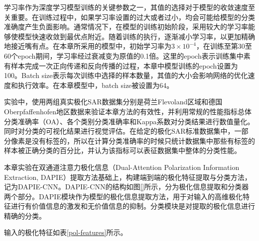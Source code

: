 学习率作为深度学习模型训练的关键参数之一，其值的选择对于模型的收敛速度至关重要。在训练过程中，如果学习率设置的过大或者过小，均会可能给模型的分类准确度产生负面影响。通常情况下，在模型的训练初始阶段，采用较大的学习率能够使模型快速收敛到最优点附近。随着训练的执行，逐渐减小学习率，以更加精确地接近嘴有点。在本章所采用的模型中，初始学习率为$3\times 10^{-4}$，在训练至第30至60个epoch期间，学习率经过衰减变为原值的0.1倍。这里的epoch表示训练集中素有样本完成一次正向传递和反向传播的过程，本章中模型训练的epoch设置为100。Batch size表示每次训练中选择的样本数量，其值的大小会影响网络的优化速度和执行效率。在本章模型中，batch size被设置为64。

实验中，使用两组真实极化SAR数据集分别是荷兰Flevoland区域和德国Oberpfaffenhofen地区数据来验证本章方法的有效性，并利用常规的性能指标总体分类准确率（OA）、各个类别分类准确率和Kappa系数对分类结果进行数值量化。同时对分类的可视化结果进行视觉评估。在给定的极化SAR标准数据集中，一部分像素是没有标签的，所以在计算分类准确率的时候只统计数据集中那些有标签的样本被正确分类的百分比，并认为该指标可以表征数据集中整体的分类性能。

本章实验在双通道注意力极化信息（Dual-Attention Polarization Information Extraction, DAPIE）提取方法基础上，构建端到端的极化特征提取与分类方法，记为DAPIE-CNN。DAPIE-CNN的结构如图\ref{}所示，分为极化信息提取和分类器两个部分。DAPIE模块作为模型的极化信息提取方法，用于对输入的高维极化特征进行有价值信息的激发和无价值信息的抑制。分类模块是对提取的极化信息进行精确的分类。

输入的极化特征如表\ref{pol-features}所示。
\begin{table}[ht]
    \caption{使用的极化特征列表}
    \label{pol-features}
\end{table}

